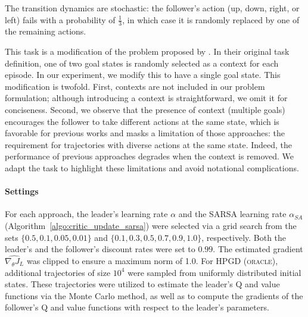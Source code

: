 \documentclass[letterpaper]{article} %
\begin{document}
The transition dynamics are stochastic: the follower's action (up, down, right, or left) fails with a probability of $\frac{1}{3}$, in which case it is randomly replaced by one of the remaining actions.

This task is a modification of the problem proposed by \citet{Thoma2024-em}.
In their original task definition, one of two goal states is randomly selected as a context for each episode. In our experiment, we modify this to have a single goal state. This modification is twofold. First, contexts are not included in our problem formulation; although introducing a context is straightforward, we omit it for conciseness. Second, we observe that the presence of context (multiple goals) encourages the follower to take different actions at the same state, which is favorable for previous works and masks a limitation of those approaches: the requirement for trajectories with diverse actions at the same state. Indeed, the performance of previous approaches degrades when the context is removed. We adapt the task to highlight these limitations and avoid notational complications.

\paragraph{Settings}
For each approach, the leader’s learning rate $\alpha$ and the SARSA learning rate $\alpha_{SA}$ (Algorithm~\ref{algo:critic_update_sarsa}) were selected via a grid search from the sets $\{0.5, 0.1, 0.05, 0.01\}$ and $\{0.1, 0.3, 0.5, 0.7, 0.9, 1.0\}$, respectively.
Both the leader's and the follower's discount rates were set to $0.99$.
The estimated gradient $\widehat{\nabla_{\theta} J_L}$ was clipped to ensure a maximum norm of 1.0.
For \textsc{HPGD (oracle)}, additional trajectories of size $10^4$ were sampled from uniformly distributed initial states.  
These trajectories were utilized to estimate the leader’s Q and value functions via the Monte Carlo method, as well as to compute the gradients of the follower’s Q and value functions with respect to the leader’s parameters.

\end{document}
